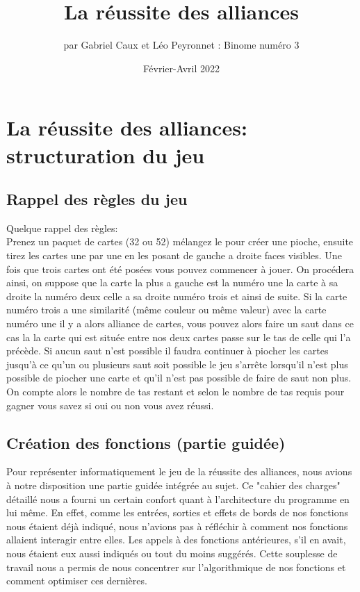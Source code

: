 \documentclass[10pt,a4paper,french,titlepage]{article}
\author{par Gabriel Caux et Léo Peyronnet : Binome numéro 3}
\title{La réussite des alliances}
\date{Février-Avril 2022}
\theoremstyle{definition}
\begin{document}
\maketitle
\tableofcontents
\section{La réussite des alliances: structuration du jeu}
\subsection{Rappel des règles du jeu}
Quelque rappel des règles:\\
Prenez un paquet de cartes (32 ou 52) mélangez le pour créer une pioche, ensuite tirez les cartes une par une en les posant de gauche a droite faces visibles. Une fois que trois cartes ont été posées vous pouvez commencer à jouer. On procédera ainsi, on suppose que la carte la plus a gauche est la numéro une la carte à sa droite la numéro deux celle a sa droite numéro trois et ainsi de suite. Si la carte numéro trois a une similarité (même couleur ou même valeur) avec la carte numéro une il y a alors alliance de cartes, vous pouvez alors faire un saut dans ce cas la la carte qui est située entre nos deux cartes passe sur le tas de celle qui l'a précède. Si aucun saut n'est possible il faudra continuer à piocher les cartes jusqu'à ce qu'un ou plusieurs saut soit possible le jeu s'arrête lorsqu'il n'est plus possible de piocher une carte et qu'il n'est pas possible de faire de saut non plus. On compte alors le nombre de tas restant et selon le nombre de tas requis pour gagner vous savez si oui ou non vous avez réussi.

\subsection{Création des fonctions (partie guidée)}
Pour représenter informatiquement le jeu de la réussite des alliances, nous avions à notre disposition une partie guidée intégrée au sujet.
Ce "cahier des charges" détaillé nous a fourni un certain confort quant à l'architecture du programme en lui même. En effet, comme les entrées, 
sorties et effets de bords de nos fonctions nous étaient déjà indiqué, nous n'avions pas à réfléchir à comment nos fonctions allaient interagir entre elles. Les appels à des fonctions antérieures, s'il en avait, nous étaient eux aussi indiqués ou tout du moins suggérés. Cette souplesse de travail nous
a permis de nous concentrer sur l'algorithmique de nos fonctions et comment optimiser ces dernières.\\
\end{document}
